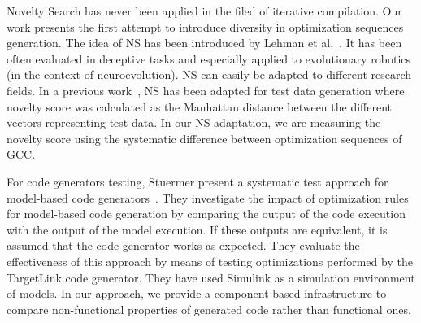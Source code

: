 Novelty Search has never been applied in the filed of iterative compilation. Our work presents the first attempt to introduce diversity in optimization sequences generation. The idea of NS has been introduced by Lehman et al.~\cite{lehman2008exploiting}. It has been often evaluated in deceptive tasks and especially applied to evolutionary robotics~\cite{risi2010evolving,krvcah2012solving} (in the context of neuroevolution). 
NS can easily be adapted to different research fields. In a previous work~\cite{boussaa2015novelty}, NS has been adapted for test data generation where novelty score was calculated as the Manhattan distance between the different vectors representing test data.
In our NS adaptation, we are measuring the novelty score using the systematic difference between optimization sequences of GCC.

For code generators testing, Stuermer \etal present a systematic test approach for model-based code generators~\cite{stuermer2007systematic}. They investigate the impact of optimization rules for model-based code generation by comparing the output of the code execution with the output of the model execution. 
If these outputs are equivalent, it is assumed that the code generator works as expected. 
They evaluate the effectiveness of this approach by means of testing optimizations performed by the TargetLink code generator. 
They have used Simulink as a simulation environment of models. 
In our approach, we provide a component-based infrastructure to compare non-functional properties of generated code rather than functional ones. 
\fi
